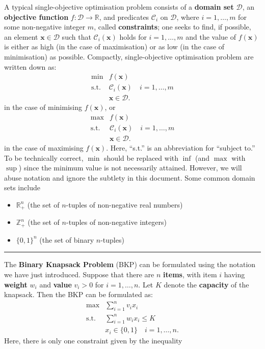 A typical single-objective optimisation problem consists of a
\textbf{domain set} \(\mathcal{D}\), an \textbf{objective function}
\(f:\mathcal{D} \rightarrow \mathbb{R}\), and predicates
\(\mathcal{C}_i\) on \(\mathcal{D}\), where \(i = 1,\ldots,m\) for some
non-negative integer \(m\), called \textbf{constraints};  one seeks
to find, if possible, an element \(\mathbf{x} \in \mathcal{D}\) such
that \(\mathcal{C}_i(\mathbf{x})\) holds for \(i = 1,\ldots,m\) and the
value of \(f(\mathbf{x})\) is either as high (in the case of
maximisation) or as low (in the case of minimisation) as possible.
\newl Compactly, single-objective optimisation problem are written down as:
\[\begin{array}{rl}
\min & f(\mathbf{x}) \\
\mbox{s.t.}
 & \mathcal{C}_i(\mathbf{x}) \quad i = 1,\ldots,m \\
 & \mathbf{x} \in \mathcal{D}.
\end{array}\] in the case of minimising \(f(\mathbf{x})\), or
\[\begin{array}{rl}
\max & f(\mathbf{x}) \\
\mbox{s.t.}
 & \mathcal{C}_i(\mathbf{x}) \quad i = 1,\ldots,m \\
 & \mathbf{x} \in \mathcal{D}.
\end{array}\] in the case of maximising \(f(\mathbf{x})\). Here,
``s.t.'' is an abbreviation for ``subject to.''
\newl To be technically correct, \(\min\) should be replaced with \(\inf\)
(and \(\max\) with \(\sup\)) since the minimum value is not necessarily
attained. However, we will abuse notation and ignore the subtlety in
this document.
\newl Some common domain sets include
\begin{itemize}[noitemsep]
\item
  \(\mathbb{R}^n_+\) (the set of \(n\)-tuples of non-negative real
  numbers)
\item
  \(\mathbb{Z}^n_+\) (the set of \(n\)-tuples of non-negative integers)
\item
  \(\{0,1\}^n\) (the set of binary \(n\)-tuples)
\end{itemize}
\begin{center}\rule{0.5\linewidth}{.4pt}\end{center}
The \textbf{Binary Knapsack Problem} (BKP) can be formulated using the notation
we have just introduced. Suppose that there are \(n\) \textbf{items}, with item
\(i\) having \textbf{weight} \(w_i\) and \textbf{value} \(v_i > 0\) for \(i = 1,\ldots, n\). 
Let \(K\) denote the \textbf{capacity} of the knapsack. \newl Then the BKP can be formulated as: \[\begin{array}{rl}
\max & \sum\limits_{i = 1}^n v_i x_i \\
\mbox{s.t.} & \sum\limits_{i = 1}^n w_i x_i \leq K \\
 & x_i \in \{0,1\} \quad i = 1,\ldots, n.
\end{array}\] Here, there is only one constraint given by the inequality

